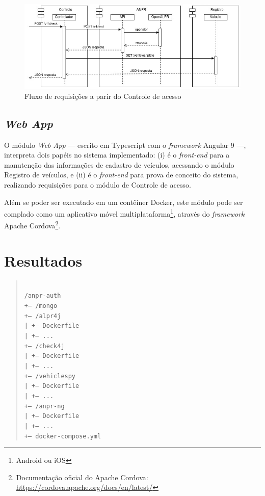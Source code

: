 \documentclass[12pt]{article}
\begin{document}
\begin{figure}[ht]
	\centering
	\includegraphics[width=1\textwidth]{check4j.jpg}
	\caption{Fluxo de requisições a parir do Controle de acesso}
	\label{fig:check4j}
\end{figure}

\subsection{\textit{Web App}}

O módulo \textit{Web App} — escrito em Typescript com o \textit{framework} Angular 9 —, interpreta dois papéis no sistema implementado: (i) é o \textit{front-end} para a manutenção das informações de cadastro de veículos, acessando o módulo Registro de veículos, e (ii) é o \textit{front-end} para prova de conceito do sistema, realizando requisições para o módulo de Controle de acesso.

Além se poder ser executado em um contêiner Docker, este módulo pode ser complado como um aplicativo móvel multiplataforma\footnote{Android ou iOS}, através do \textit{framework} Apache Cordova\footnote{Documentação oficial do Apache Cordova: \url{https://cordova.apache.org/docs/en/latest/}}.

\section{Resultados} 


\begin{quotation}
	\texttt{\\
		/anpr-auth\\
		+-- /mongo\\
		+-- /alpr4j\\
		|   +-- Dockerfile\\
		|   +-- ...\\
		+-- /check4j\\
		|   +-- Dockerfile\\
		|   +-- ...\\
		+-- /vehiclespy\\
		|   +-- Dockerfile\\
		|   +-- ...\\
		+-- /anpr-ng\\
		|   +-- Dockerfile\\
		|   +-- ...\\
		+-- docker-compose.yml\\}
\end{quotation}
\end{document}
